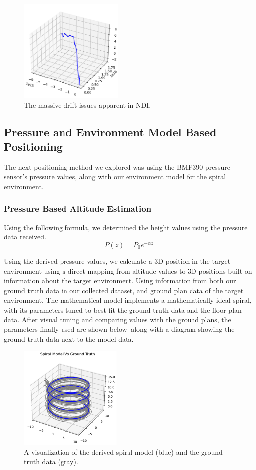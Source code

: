 \begin{figure}[h] 
	\centering \includegraphics[height=5cm]{./images/ndi.png}
	\caption{The massive drift issues apparent in NDI.}
\end{figure}

\subsection{Pressure and Environment Model Based Positioning}
The next positioning method we explored was using the BMP390 pressure sensor's pressure values, along with our environment model for the spiral environment.
\subsubsection{Pressure Based Altitude Estimation}
Using the following formula, we determined the height values using the pressure data received.
$$P\left(z\right)=P_0e^{-\alpha z}$$

Using the derived pressure values, we calculate a 3D position in the target environment using a direct mapping from altitude values to 3D positions built on information about the target environment. Using information from both our ground truth data in our collected dataset, and ground plan data of the target environment. The mathematical model implements a mathematically ideal spiral, with its parameters tuned to best fit the ground truth data and the floor plan data. After visual tuning and comparing values with the ground plans, the parameters finally used are shown below, along with a diagram showing the ground truth data next to the model data.

\begin{figure}[h] 
	\centering \includegraphics[height=5cm]{./images/spiralmodel.png}
	\caption{A visualization of the derived spiral model (blue) and the ground truth data (gray).}
\end{figure}

